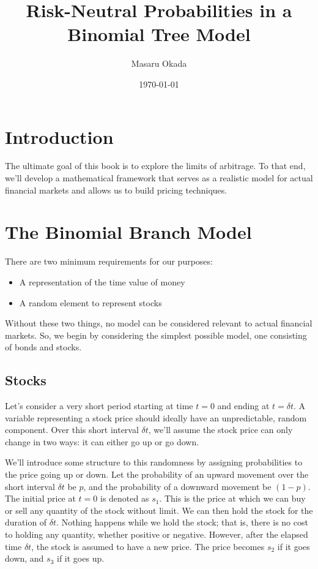 \documentclass[uplatex,a4j,12pt,dvipdfmx]{jsarticle}
\title{
Risk-Neutral Probabilities in a Binomial Tree Model
}
\author{Masaru Okada}
\date{\today}
\begin{document}
\maketitle

\tableofcontents

\newpage

\section{Introduction}
The ultimate goal of this book is to explore the limits of arbitrage. To that end, we'll develop a mathematical framework that serves as a realistic model for actual financial markets and allows us to build pricing techniques.

\section{The Binomial Branch Model}
There are two minimum requirements for our purposes:
\begin{itemize}
	\item A representation of the time value of money
	\item A random element to represent stocks
\end{itemize}
Without these two things, no model can be considered relevant to actual financial markets. So, we begin by considering the simplest possible model, one consisting of bonds and stocks.

\subsection{Stocks}
Let's consider a very short period starting at time $t=0$ and ending at $t=\delta t$. A variable representing a stock price should ideally have an unpredictable, random component. Over this short interval $\delta t$, we'll assume the stock price can only change in two ways: it can either go up or go down.

We'll introduce some structure to this randomness by assigning probabilities to the price going up or down. Let the probability of an upward movement over the short interval $\delta t$ be $p$, and the probability of a downward movement be $(1-p)$. The initial price at $t=0$ is denoted as $s_1$. This is the price at which we can buy or sell any quantity of the stock without limit. We can then hold the stock for the duration of $\delta t$. Nothing happens while we hold the stock; that is, there is no cost to holding any quantity, whether positive or negative. However, after the elapsed time $\delta t$, the stock is assumed to have a new price. The price becomes $s_2$ if it goes down, and $s_3$ if it goes up.
\end{document}
